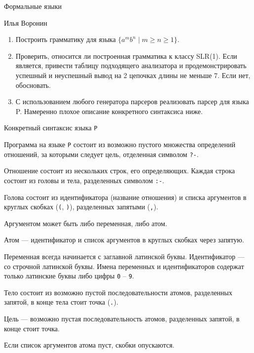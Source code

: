 \documentclass[12pt]{article}
\begin{document}
\begin{center}
{\LARGE Формальные языки}

\bigskip

{\Large Илья Воронин}
\end{center} 

\bigskip

\begin{enumerate}
  \item Построить грамматику для языка $\{ a^m b^n \mid m \geq n \geq 1 \}$.
  \item Проверить, относится ли построенная грамматика к классу SLR(1). Если является, привести таблицу подходящего анализатора и продемонстрировать успешный и неуспешный вывод на 2 цепочках длины не меньше 7. Если нет, обосновать.
  \item С использованием любого генератора парсеров реализовать парсер для языка P. Намеренно плохое описание конкретного синтаксиса ниже.
\end{enumerate}

\begin{center}
    \Large{Конкретный синтаксис языка \verb!P!}
\end{center}

Программа на языке \verb!P! состоит из возможно пустого множества определений отношений, за которыми следует цель, отделенная символом \verb!?-!.

Отношение состоит из нескольких строк, его определяющих. 
Каждая строка состоит из головы и тела, разделенных символом \verb!:-!. 

Голова состоит из идентификатора (название отношения) и списка аргументов в круглых скобках (\verb!(!, \verb!)!), разделенных запятыми (\verb!,!). 

Аргументом может быть либо переменная, либо атом. 

Атом --- идентификатор и список аргументов в круглых скобках через запятую. 

Переменная всегда начинается с заглавной латинской буквы. Идентификатор --- со строчной латинской буквы.
Имена переменных и идентификаторов содержат только латинские буквы либо цифры \verb!0! -- \verb!9!.

Тело состоит из возможно пустой последовательности атомов, разделенных запятой, в конце тела стоит точка (\verb!.!).

Цель --- возможно пустая последовательность атомов, разделенных запятой, в конце стоит точка. 

Если список аргументов атома пуст, скобки опускаются. 
\end{document}
